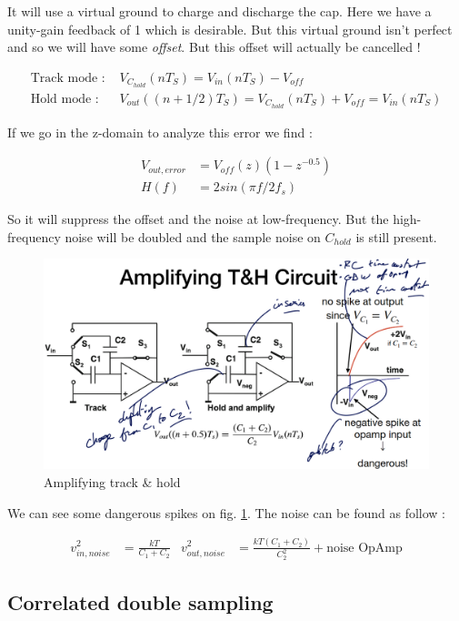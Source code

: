 \documentclass{report}
\begin{document}
It will use a virtual ground to charge and discharge the cap. Here we have a unity-gain feedback of 1 which is desirable. But this virtual ground isn't perfect and so we will have some \textit{offset}. But this offset will actually be cancelled !

\begin{align}
    \text{Track mode : }& V_{C_{hold}} (nT_S) = V_{in}(nT_S) - V_{off} \\
    \text{Hold mode : }&  V_{out}((n+1/2)T_S) = V_{C_{hold}} (nT_S) + V_{off} = V_{in}(nT_S)
\end{align}

If we go in the z-domain to analyze this error we find : 

\begin{align}
    V_{out,error} &= V_{off} (z) (1-z^{-0.5})\\
    H(f) &= 2 sin(\pi f/2f_s)
\end{align}

So it will suppress the offset and the noise at low-frequency. But the high-frequency noise will be doubled and the sample noise on $C_{hold}$ is still present.

\begin{figure}[H]
    \centering
    \includegraphics[width=0.75\linewidth]{img/Amplifying_Track.png}
    \caption{Amplifying track \& hold}
    \label{fig:amplifying-th-label}
\end{figure}

We can see some dangerous spikes on fig. \ref{fig:amplifying-th-label}. The noise can be found as follow :

\begin{align}
    v_{in,noise}^2 &= \frac{kT}{C_1+C_2} & v_{out,noise}^2 &= \frac{kT(C_1+C_2)}{C_2^2} + \text{noise OpAmp}
\end{align}

\subsection{Correlated double sampling}
\end{document}
